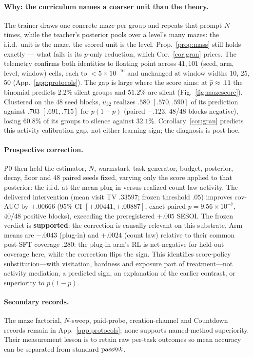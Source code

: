 \paragraph{Why: the curriculum names a coarser unit than the theory.}
The trainer draws one concrete maze per group and repeats that prompt $N$
times, while the teacher's posterior pools over a level's many mazes: the
i.i.d.\ unit is the maze, the scored unit is the level. Prop.~\ref{prop:mass}
still holds exactly --- what fails is its $p$-only reduction, which
Cor.~\ref{cor:gran} prices. The telemetry confirms both identities to floating
point across $41{,}101$ (seed, arm, level, window) cells, each to
$<5\times10^{-16}$ and unchanged at window widths $10$, $25$, $50$
(App.~\ref{app:protocols}). The gap is large where the score aims: at $\hat
p\approx.11$ the binomial predicts $2.2\%$ silent groups and $51.2\%$ are
silent (Fig.~\ref{fig:mazescore}). Clustered on the 48 seed blocks, $u_{32}$
realizes $.580$ $[.570,.590]$ of its prediction against $.703$ $[.691,.715]$
for $p(1-p)$ (paired $-.123$, 48/48 blocks negative), losing $60.8\%$ of its
groups to silence against $32.1\%$. Corollary~\ref{cor:gran} predicts this
activity-calibration gap, not either learning sign; the diagnosis is post-hoc.

\paragraph{Prospective correction.}
P0 then held the estimator, $N$, warmstart, task generator, budget, posterior,
decay, floor and 48 paired seeds fixed, varying only the score applied to that
posterior: the i.i.d.-at-the-mean plug-in versus realized count-law activity.
The delivered intervention (mean visit TV $.33597$; frozen threshold $.05$)
improves cov-AUC by $+.00666$ (95\% CI $[+.00441,+.00887]$, exact paired
$p=9.56\times10^{-7}$, 40/48 positive blocks), exceeding the preregistered
$+.005$ SESOI. The frozen verdict is \textbf{supported}: the correction is
causally relevant on this substrate. Arm means are $-.0043$ (plug-in) and
$+.0024$ (count law) relative to their common post-SFT coverage $.280$: the
plug-in arm's RL is net-negative for held-out coverage here, while the
correction flips the sign. This identifies score-policy substitution---with
visitation, hardness and exposure part of treatment---not activity mediation,
a predicted sign, an explanation of the earlier contrast, or superiority to
$p(1-p)$.

\paragraph{Secondary records.}
The maze factorial, $N$-sweep, paid-probe, creation-channel and Countdown
records remain in App.~\ref{app:protocols}; none supports named-method
superiority. Their measurement lesson is to retain raw per-task outcomes so
mean accuracy can be separated from standard $\text{pass@}k$.

